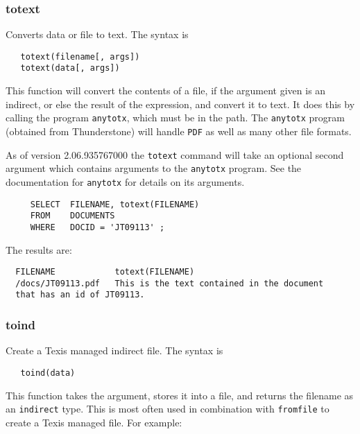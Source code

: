 \subsubsection{totext}

Converts data or file to text.  The syntax is
\begin{verbatim}
   totext(filename[, args])
   totext(data[, args])
\end{verbatim}

This function will convert the contents of a file, if the argument given is
an indirect, or else the result of the expression, and convert it to text.
It does this by calling the program \verb'anytotx', which must be in the
path.  The \verb`anytotx` program (obtained from Thunderstone) will handle
\verb`PDF` as well as many other file formats.

As of version 2.06.935767000 the \verb`totext` command will take an optional
second argument which contains arguments to the \verb`anytotx` program.
See the documentation for \verb`anytotx` for details on its arguments.

\begin{verbatim}
     SELECT  FILENAME, totext(FILENAME)
     FROM    DOCUMENTS
     WHERE   DOCID = 'JT09113' ;
\end{verbatim}

The results are:

\begin{screen}
\begin{verbatim}
  FILENAME            totext(FILENAME)
  /docs/JT09113.pdf   This is the text contained in the document
  that has an id of JT09113.
\end{verbatim}
\end{screen}

\subsubsection{toind}

Create a Texis managed indirect file.  The syntax is
\begin{verbatim}
   toind(data)
\end{verbatim}

This function takes the argument, stores it into a file, and returns the
filename as an \verb`indirect` type.  This is most often used in combination
with \verb`fromfile` to create a Texis managed file.  For example:

